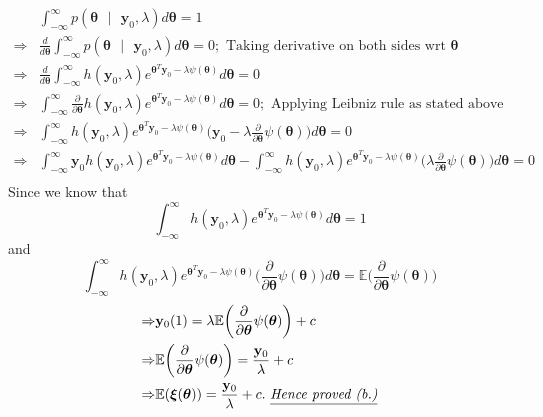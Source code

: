 \documentclass[11pt]{article}
\begin{document}
\begin{equation}
  \nonumber
  \begin{aligned}
    & \int_{-\infty}^{\infty} p(\bm{\theta} \text{ }| \text{ } \mathbf{y}_{0}, \lambda)d\bm{\theta} = 1\\
    \Rightarrow & \frac{d}{d \bm{\theta}} \int_{-\infty}^{\infty} p(\bm{\theta} \text{ }| \text{ } \mathbf{y}_{0}, \lambda)d\bm{\theta} = 0; \text{ Taking derivative on both sides wrt } \bm{\theta}\\
    \Rightarrow & \frac{d}{d \bm{\theta}} \int_{-\infty}^{\infty} h(\mathbf{y}_{0}, \lambda)e^{\bm{\theta}^{T}\mathbf{y}_{0} - \lambda \psi(\bm{\theta})}d\bm{\theta} = 0\\
    \Rightarrow &  \int_{-\infty}^{\infty} \frac{\partial}{\partial \bm{\theta}} h(\mathbf{y}_{0}, \lambda)e^{\bm{\theta}^{T}\mathbf{y}_{0} - \lambda \psi(\bm{\theta})}d\bm{\theta} = 0; \text{ Applying Leibniz rule as stated above}\\
    \Rightarrow &  \int_{-\infty}^{\infty} h(\mathbf{y}_{0}, \lambda)e^{\bm{\theta}^{T}\mathbf{y}_{0} - \lambda \psi(\bm{\theta})}\bigg(\mathbf{y}_{0} - \lambda \frac{\partial}{\partial \bm{\theta}} \psi(\bm{\theta}) \bigg)d\bm{\theta} = 0\\
    \Rightarrow &  \int_{-\infty}^{\infty} \mathbf{y}_{0}h(\mathbf{y}_{0}, \lambda)e^{\bm{\theta}^{T}\mathbf{y}_{0} - \lambda \psi(\bm{\theta})}d\bm{\theta} - \int_{-\infty}^{\infty}h(\mathbf{y}_{0}, \lambda)e^{\bm{\theta}^{T}\mathbf{y}_{0} - \lambda \psi(\bm{\theta})}\bigg(\lambda \frac{\partial}{\partial \bm{\theta}} \psi(\bm{\theta}) \bigg)d\bm{\theta} = 0\\
  \end{aligned}
\end{equation}
Since we know that
\begin{equation}
  \nonumber
  \int_{-\infty}^{\infty} h(\mathbf{y}_{0}, \lambda)e^{\bm{\theta}^{T}\mathbf{y}_{0} - \lambda \psi(\bm{\theta})}d\bm{\theta} = 1
\end{equation}
and
\begin{equation}
  \nonumber
  \int_{-\infty}^{\infty}h(\mathbf{y}_{0}, \lambda)e^{\bm{\theta}^{T}\mathbf{y}_{0} - \lambda \psi(\bm{\theta})}\bigg(\frac{\partial}{\partial \bm{\theta}} \psi(\bm{\theta}) \bigg)d\bm{\theta} = \mathbb{E}\bigg(\frac{\partial}{\partial \bm{\theta}}\psi(\bm{\theta})\bigg)
\end{equation}
\begin{equation}
  \nonumber
  \begin{aligned}
    \Rightarrow & \mathbf{y}_{0}(1) = \lambda\mathbb{E}\bigg(\frac{\partial}{\partial \bm{\theta}}\psi(\bm{\theta})\bigg) + c\\
    \Rightarrow & \mathbb{E}\bigg(\frac{\partial}{\partial \bm{\theta}}\psi(\bm{\theta})\bigg) = \frac{\mathbf{y}_{0}}{\lambda} + c\\
    \Rightarrow & \mathbb{E}(\bm{\xi}({\bm{\theta}})) = \frac{\mathbf{y}_{0}}{\lambda} + c. \text{ \emph{\underline{Hence proved (b.)}}}
  \end{aligned}
\end{equation}
\end{document}

